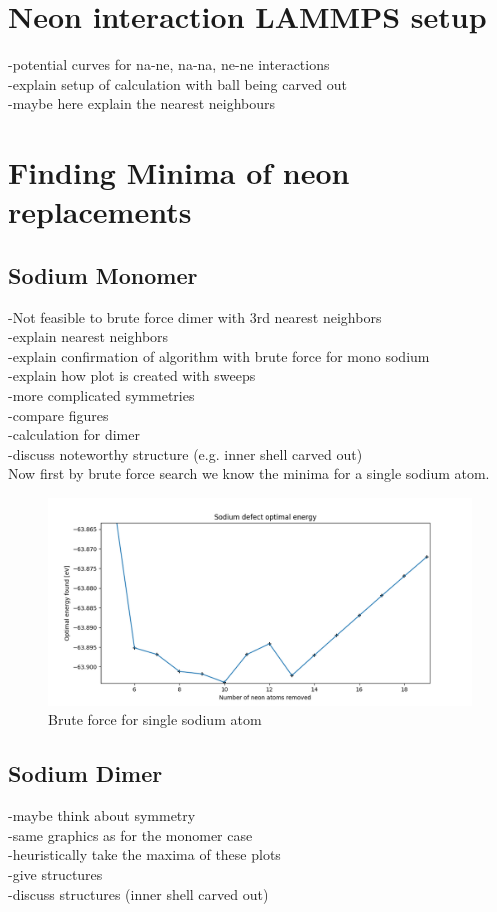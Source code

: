 \chapter{Neon interaction LAMMPS setup}
-potential curves for na-ne, na-na, ne-ne interactions\\
-explain setup of calculation with ball being carved out\\
-maybe here explain the nearest neighbours
\chapter{Finding Minima of neon replacements}
\label{chap:Erstes Kapitel}
\section{Sodium Monomer}
-Not feasible to brute force dimer with 3rd nearest neighbors\\
-explain nearest neighbors\\
-explain confirmation of algorithm with brute force for mono sodium\\
-explain how plot is created with sweeps\\
-more complicated symmetries\\
-compare figures\\
-calculation for dimer\\
-discuss noteworthy structure (e.g. inner shell carved out)\\
Now first by brute force search we know the minima for a single sodium atom.

\begin{figure}[h!]
	\centering
	\includegraphics[scale=0.5]{./Inhalt/Bilder/optimal_defect_brute_force.png}
	\caption{Brute force for single sodium atom}
	\label{fig:bruteforcesodium}
\end{figure} 

\section{Sodium Dimer}
-maybe think about symmetry\\
-same graphics as for the monomer case\\
-heuristically take the maxima of these plots \\
-give structures\\
-discuss structures (inner shell carved out)\\

